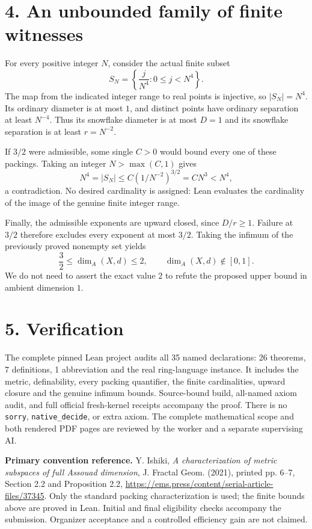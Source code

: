 \documentclass[10pt]{article}
\begin{document}
\section*{4. An unbounded family of finite witnesses}
For every positive integer $N$, consider the actual finite subset
\[
S_N=\left\{\frac{j}{N^4}:0\le j<N^4\right\}.
\]
The map from the indicated integer range to real points is injective, so $|S_N|=N^4$. Its ordinary diameter is at most $1$, and distinct points have ordinary separation at least $N^{-4}$. Thus its snowflake diameter is at most $D=1$ and its snowflake separation is at least $r=N^{-2}$.

If $3/2$ were admissible, some single $C>0$ would bound every one of these packings. Taking an integer $N>\max(C,1)$ gives
\[
N^4=|S_N|\le C(1/N^{-2})^{3/2}=CN^3<N^4,
\]
a contradiction. No desired cardinality is assigned: Lean evaluates the cardinality of the image of the genuine finite integer range.

Finally, the admissible exponents are upward closed, since $D/r\ge1$. Failure at $3/2$ therefore excludes every exponent at most $3/2$. Taking the infimum of the previously proved nonempty set yields
\[
\frac32\le\dim_A(X,d)\le2,
\qquad\dim_A(X,d)\notin[0,1].
\]
We do not need to assert the exact value $2$ to refute the proposed upper bound in ambient dimension $1$.

\section*{5. Verification}
The complete pinned Lean project audits all 35 named declarations: 26 theorems, 7 definitions, 1 abbreviation and the real ring-language instance. It includes the metric, definability, every packing quantifier, the finite cardinalities, upward closure and the genuine infimum bounds. Source-bound build, all-named axiom audit, and full official fresh-kernel receipts accompany the proof. There is no \texttt{sorry}, \texttt{native\_decide}, or extra axiom. The complete mathematical scope and both rendered PDF pages are reviewed by the worker and a separate supervising AI.

\textbf{Primary convention reference.} Y. Ishiki, \emph{A characterization of metric subspaces of full Assouad dimension}, J. Fractal Geom. (2021), printed pp. 6--7, Section 2.2 and Proposition 2.2, \url{https://ems.press/content/serial-article-files/37345}. Only the standard packing characterization is used; the finite bounds above are proved in Lean. Initial and final eligibility checks accompany the submission. Organizer acceptance and a controlled efficiency gain are not claimed.
\end{document}
